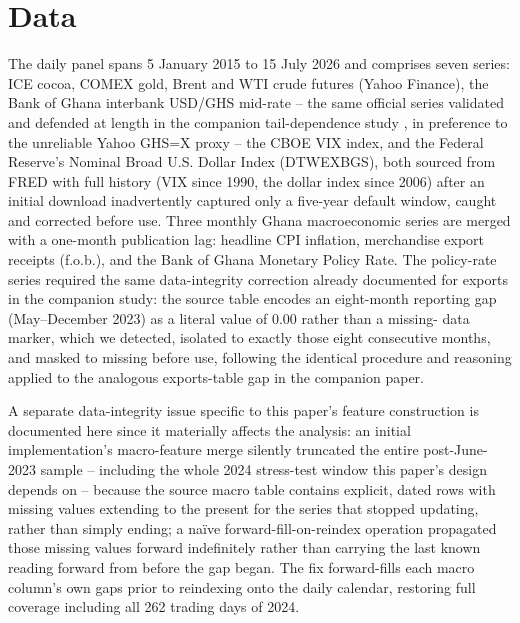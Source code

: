 \documentclass[final,3p,times,authoryear]{elsarticle}
\begin{document}
\section{Data}
\label{sec:data}

The daily panel spans 5 January 2015 to 15 July 2026 and comprises seven
series: ICE cocoa, COMEX gold, Brent and WTI crude futures (Yahoo
Finance), the Bank of Ghana interbank USD/GHS mid-rate -- the same
official series validated and defended at length in the companion
tail-dependence study \citep{nelson2026tail}, in preference to the
unreliable Yahoo GHS=X proxy -- the CBOE VIX index, and the Federal
Reserve's Nominal Broad U.S. Dollar Index (DTWEXBGS), both sourced from
FRED with full history (VIX since 1990, the dollar index since 2006)
after an initial download inadvertently captured only a five-year
default window, caught and corrected before use. Three monthly Ghana
macroeconomic series are merged with a one-month publication lag:
headline CPI inflation, merchandise export receipts (f.o.b.), and the
Bank of Ghana Monetary Policy Rate. The policy-rate series required the
same data-integrity correction already documented for exports in the
companion study: the source table encodes an eight-month reporting gap
(May--December 2023) as a literal value of 0.00 rather than a missing-
data marker, which we detected, isolated to exactly those eight
consecutive months, and masked to missing before use, following the
identical procedure and reasoning applied to the analogous exports-table
gap in the companion paper.

A separate data-integrity issue specific to this paper's feature
construction is documented here since it materially affects the
analysis: an initial implementation's macro-feature merge silently
truncated the entire post-June-2023 sample -- including the whole 2024
stress-test window this paper's design depends on -- because the source
macro table contains explicit, dated rows with missing values extending
to the present for the series that stopped updating, rather than simply
ending; a na\"ive forward-fill-on-reindex operation propagated those
missing values forward indefinitely rather than carrying the last known
reading forward from before the gap began. The fix forward-fills each
macro column's own gaps prior to reindexing onto the daily calendar,
restoring full coverage including all 262 trading days of 2024.
\end{document}
